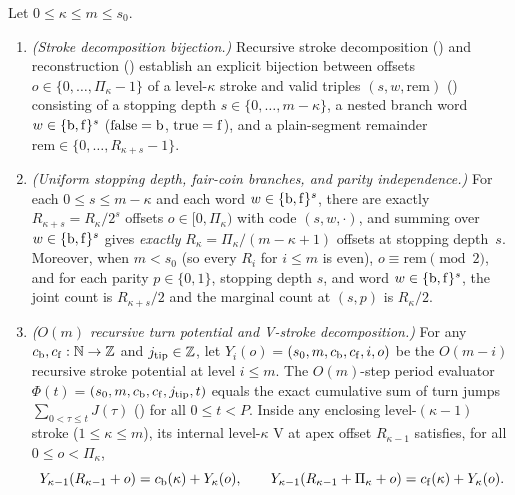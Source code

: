 \begin{proposition}\label{prop:SL}
Let $0 \le \kappa \le m \le s_0$.
\begin{enumerate}
\item \emph{(Stroke decomposition bijection.)} Recursive stroke decomposition () and reconstruction
  () establish an explicit bijection between offsets $o \in \{0, \dots, \Pi_\kappa - 1\}$ of a
  level-$\kappa$ stroke and valid triples $(s, w, \mathrm{rem})$ () consisting of a stopping depth
  $s \in \{0, \dots, m - \kappa\}$, a nested branch word $w \in \{\mathrm{b}, \mathrm{f}\}^s$ ($\mathrm{false} = \mathrm{b}$,
  $\mathrm{true} = \mathrm{f}$), and a plain-segment remainder $\mathrm{rem} \in \{0, \dots, R_{\kappa + s} - 1\}$.
\item \emph{(Uniform stopping depth, fair-coin branches, and parity independence.)} For each $0 \le s \le m - \kappa$ and
  each word $w \in \{\mathrm{b}, \mathrm{f}\}^s$, there are exactly $R_{\kappa + s} = R_\kappa / 2^s$ offsets $o \in [0, \Pi_\kappa)$
  with code $(s, w, \cdot)$, and summing over $w \in \{\mathrm{b}, \mathrm{f}\}^s$ gives \emph{exactly} $R_\kappa = \Pi_\kappa /
  (m - \kappa + 1)$ offsets at stopping depth~$s$. Moreover, when $m < s_0$ (so every $R_i$ for $i \le m$ is even),
  $o \equiv \mathrm{rem} \pmod 2$, and for each parity $p \in \{0, 1\}$, stopping depth $s$, and word $w \in \{\mathrm{b},
  \mathrm{f}\}^s$, the joint count is $R_{\kappa + s}/2$ and the marginal count at $(s, p)$ is $R_\kappa / 2$.
\item \emph{($O(m)$ recursive turn potential and V-stroke decomposition.)} For any $c_{\mathrm{b}}, c_{\mathrm{f}} : \mathbb{N} \to \mathbb{Z}$ and
  $j_{\mathrm{tip}} \in \mathbb{Z}$, let $Y_i(o) = {}$$(s_0, m, c_{\mathrm{b}}, c_{\mathrm{f}}, i, o)$ be the $O(m - i)$
  recursive stroke potential at level $i \le m$. The $O(m)$-step period evaluator $\Phi(t) =
  {}$$(s_0, m, c_{\mathrm{b}}, c_{\mathrm{f}}, j_{\mathrm{tip}}, t)$ equals the exact cumulative sum of turn jumps
  $\sum_{0 < \tau \le t} J(\tau)$ () for all $0 \le t < P$. Inside any enclosing level-$(\kappa - 1)$
  stroke ($1 \le \kappa \le m$), its internal level-$\kappa$ V at apex offset $R_{\kappa - 1}$ satisfies, for all
  $0 \le o < \Pi_\kappa$,
  \begin{equation}\label{eq:v-decomp}
    Y_{\kappa - 1}(R_{\kappa - 1} + o) = c_{\mathrm{b}}(\kappa) + Y_\kappa(o), \qquad
    Y_{\kappa - 1}(R_{\kappa - 1} + \Pi_\kappa + o) = c_{\mathrm{f}}(\kappa) + Y_\kappa(o).
  \end{equation}
\end{enumerate}
\end{proposition}

